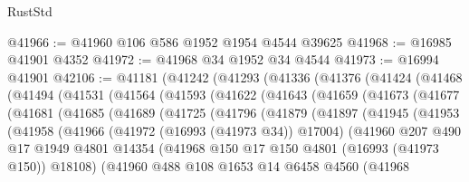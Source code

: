 \begin{lexlean}{RustStd}
\begin{coremodule}
@41966 := @41960 @106 @586 @1952 @1954 @4544 @39625
@41968 := @16985 @41901 @4352
@41972 := @41968 @34 @1952 @34 @4544
@41973 := @16994 @41901
@42106 := @41181
    (@41242
      (@41293
        (@41336
          (@41376
            (@41424
              (@41468
                (@41494
                  (@41531
                    (@41564
                      (@41593
                        (@41622
                          (@41643
                            (@41659
                              (@41673
                                (@41677
                                  (@41681
                                    (@41685
                                      (@41689
                                        (@41725
                                          (@41796
                                            (@41879
                                              (@41897
                                                (@41945
                                                  (@41953
                                                    (@41958
                                                      (@41966
                                                        (@41972 (@16993 (@41973 @34)) @17004)
                                                        (@41960
                                                          @207
                                                          @490
                                                          @17
                                                          @1949
                                                          @4801
                                                          @14354
                                                          (@41968
                                                            @150
                                                            @17
                                                            @150
                                                            @4801
                                                            (@16993 (@41973 @150))
                                                            @18108)
                                                          (@41960
                                                            @488
                                                            @108
                                                            @1653
                                                            @14
                                                            @6458
                                                            @4560
                                                            (@41968

\end{coremodule}
\end{lexlean}

